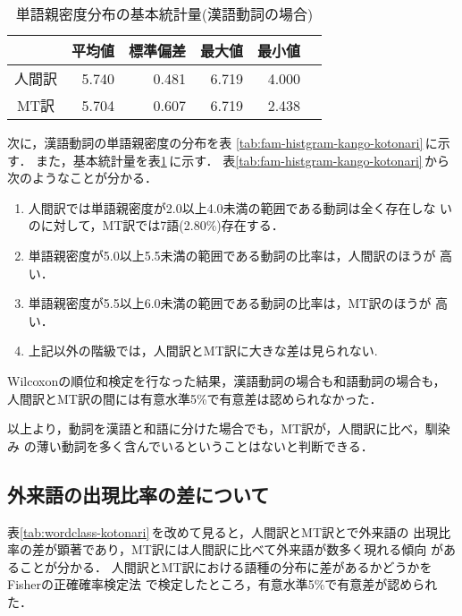 \begin{table}[htbp]
\caption{単語親密度分布の基本統計量(漢語動詞の場合)} 
\label{tab:stat-kango-kotonari}
\begin{center}
\begin{tabular}{|c||r|r|r|r|r|}\hline
 & \multicolumn{1}{c|}{平均値} &
\multicolumn{1}{c|}{標準偏差} & \multicolumn{1}{c|}{最大値} & 
\multicolumn{1}{c|}{最小値} \\\hline\hline
人間訳 & 5.740 & 0.481 & 6.719 & 4.000 \\
MT訳   & 5.704 & 0.607 & 6.719 & 2.438 \\\hline
\end{tabular}
\end{center}
\end{table}

次に，漢語動詞の単語親密度の分布を表
\ref{tab:fam-histgram-kango-kotonari}\,に示す．
また，基本統計量を表\ref{tab:stat-kango-kotonari}\,に示す．
表\ref{tab:fam-histgram-kango-kotonari}\,から次のようなことが分かる．
\begin{enumerate}
\item 人間訳では単語親密度が2.0以上4.0未満の範囲である動詞は全く存在しな
いのに対して，MT訳では7語(2.80\%)存在する．
\item 単語親密度が5.0以上5.5未満の範囲である動詞の比率は，人間訳のほうが
高い．
\item 単語親密度が5.5以上6.0未満の範囲である動詞の比率は，MT訳のほうが
高い．
\item 上記以外の階級では，人間訳とMT訳に大きな差は見られない.
\end{enumerate}

Wilcoxonの順位和検定を行なった結果，漢語動詞の場合も和語動詞の場合も，
人間訳とMT訳の間には有意水準5\%で有意差は認められなかった． 

以上より，動詞を漢語と和語に分けた場合でも，MT訳が，人間訳に比べ，馴染み
の薄い動詞を多く含んでいるということはないと判断できる．

\subsection{外来語の出現比率の差について}
\label{sec:result:foreign}

表\ref{tab:wordclass-kotonari}\,を改めて見ると，人間訳とMT訳とで外来語の
出現比率の差が顕著であり，MT訳には人間訳に比べて外来語が数多く現れる傾向
があることが分かる．
人間訳とMT訳における語種の分布に差があるかどうかをFisherの正確確率検定法
で検定したところ，有意水準5\%で有意差が認められた．

